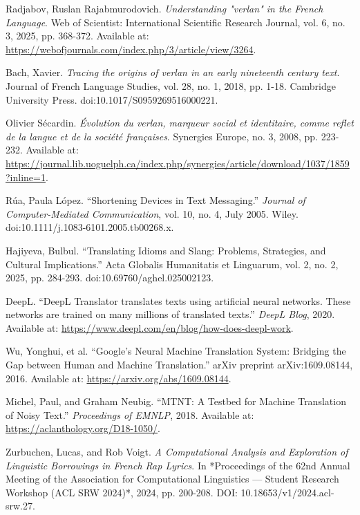 \documentclass[12pt]{article}
\begin{document}
\newpage
\begin{thebibliography}{9}

Radjabov, Ruslan Rajabmurodovich. \textit{Understanding "verlan" in the French Language}. 
Web of Scientist: International Scientific Research Journal, vol. 6, no. 3, 2025, pp. 368-372. 
Available at: \url{https://webofjournals.com/index.php/3/article/view/3264}.

Bach, Xavier. \textit{Tracing the origins of verlan in an early nineteenth century text}. 
Journal of French Language Studies, vol. 28, no. 1, 2018, pp. 1-18. 
Cambridge University Press. doi:10.1017/S0959269516000221.

Olivier Sécardin. \textit{Évolution du verlan, marqueur social et identitaire, comme reflet de la langue et de la société françaises}. 
Synergies Europe, no. 3, 2008, pp. 223-232. 
Available at: \url{https://journal.lib.uoguelph.ca/index.php/synergies/article/download/1037/1859?inline=1}.

Rúa, Paula López. “Shortening Devices in Text Messaging.” 
\textit{Journal of Computer-Mediated Communication}, vol. 10, no. 4, July 2005. 
Wiley. doi:10.1111/j.1083-6101.2005.tb00268.x.

Hajiyeva, Bulbul. “Translating Idioms and Slang: Problems, Strategies, and Cultural Implications.”  
Acta Globalis Humanitatis et Linguarum, vol. 2, no. 2, 2025, pp. 284-293. doi:10.69760/aghel.025002123.  

DeepL. “DeepL Translator translates texts using artificial neural networks. These networks are trained on many millions of translated texts.” 
\textit{DeepL Blog}, 2020. Available at: \url{https://www.deepl.com/en/blog/how-does-deepl-work}.

Wu, Yonghui, et al. “Google's Neural Machine Translation System: Bridging the Gap between Human and Machine Translation.” 
arXiv preprint arXiv:1609.08144, 2016. Available at: \url{https://arxiv.org/abs/1609.08144}.

Michel, Paul, and Graham Neubig. “MTNT: A Testbed for Machine Translation of Noisy Text.”
\textit{Proceedings of EMNLP}, 2018. Available at: \url{https://aclanthology.org/D18-1050/}.

Zurbuchen, Lucas, and Rob Voigt.  
\textit{A Computational Analysis and Exploration of Linguistic Borrowings in French Rap Lyrics}.  
In *Proceedings of the 62nd Annual Meeting of the Association for Computational Linguistics — Student Research Workshop (ACL SRW 2024)*, 2024, pp. 200-208.  
DOI: 10.18653/v1/2024.acl-srw.27.  


\end{thebibliography}
\end{document}
